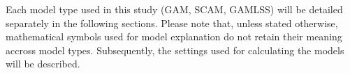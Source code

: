 Each model type used in this study (GAM, SCAM, GAMLSS) will be detailed separately in the following sections.  Please note that, unless stated otherwise, mathematical symbols used for model explanation do not retain their meaning accross model types.  Subsequently, the settings used for calculating the models will be described.

